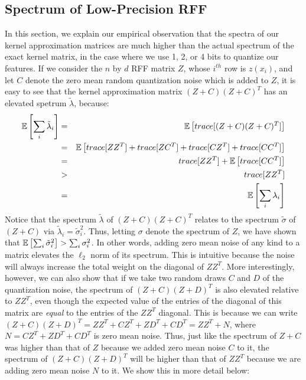 \documentclass[12pt]{article}
\newcommand{\tsigma}{\tilde{\sigma}}
\newcommand{\tlambda}{\tilde{\lambda}}
\begin{document}
\subsection{Spectrum of Low-Precision RFF}
\label{sec:spectrum}
In this section, we explain our empirical observation that the spectra of our kernel approximation matrices are much higher than the actual spectrum of the exact kernel matrix, in the case where we use 1, 2, or 4 bits to quantize our features.  If we consider the $n$ by $d$ RFF matrix $Z$, whose $i^{th}$ row is $z(x_i)$, and let $C$ denote the zero mean random quantization noise which is added to $Z$, it is easy to see that the kernel approximation matrix $(Z+C)(Z+C)^T$ has an elevated spetrum $\tlambda$, because:
\begin{eqnarray*} 
	\expect{}{\sum_i \tlambda_i} &=& \expect{}{trace[(Z+C)(Z+C)^T]} \\
	&=& \expect{}{trace[ZZ^T] + trace[ZC^T] + trace[CZ^T] + trace[CC^T]}\\
	&=& trace[ZZ^T] + \expect{}{trace[CC^T]} \\
	&>& trace[ZZ^T] \\
	&=& \expect{}{\sum_i \lambda_i}
\end{eqnarray*}
Notice that the spectrum $\tlambda$ of $(Z+C)(Z+C)^T$ relates to the spectrum $\tsigma$ of $(Z+C)$ via $\tlambda_i = \tsigma_i^2$.  Thus, letting $\sigma$ denote the spectrum of $Z$, we have shown that
$\expect{}{\sum_i \tsigma_i^2} > \sum_i \sigma_i^2$.  In other words, adding zero mean noise of any kind to a matrix elevates the $\ell_2$ norm of its spectrum.  This is intuitive because the noise will always increase the total weight on the diagonal of $ZZ^T$.
More interestingly, however, we can also show that if we take two random draws $C$ and $D$ of the quantization noise, the spectrum of $(Z+C)(Z+D)^T$ is also elevated relative to $ZZ^T$, even though the expected value of the entries of the diagonal of this matrix are \textit{equal} to the entries of the $ZZ^T$ diagonal.  This is because we can write $(Z+C)(Z+D)^T = ZZ^T + CZ^T + ZD^T + CD^T = ZZ^T + N$, where $N = CZ^T + ZD^T + CD^T$ is zero mean noise.  Thus, just like the spectrum of $Z+C$ was higher than that of $Z$ because we added zero mean noise $C$ to it, the spectrum of $(Z+C)(Z+D)^T$ will be higher than that of $ZZ^T$ because we are adding zero mean noise $N$ to it.  We show this in more detail below:
\end{document}
